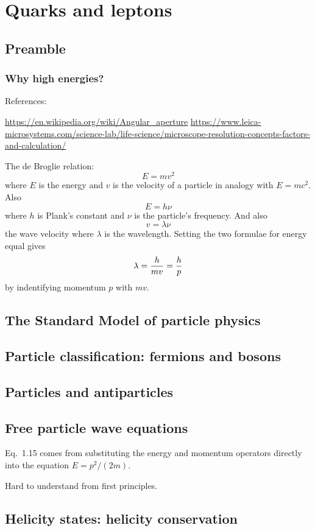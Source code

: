 \documentclass{book}
\begin{document}
\chapter{Quarks and leptons}

\section{Preamble}

\subsection{Why high energies?}

References:

\url{https://en.wikipedia.org/wiki/Angular\_aperture}
\url{https://www.leica-microsystems.com/science-lab/life-science/microscope-resolution-concepts-factors-and-calculation/}

The de Broglie relation:
$$
E = mv^2
$$
where $E$ is the energy and $v$ is the velocity of a particle in analogy with $E=mc^2$. Also
$$
E = h\nu
$$
where $h$ is Plank's constant and $\nu$ is the particle's frequency. And also
$$
v = \lambda\nu
$$
the wave velocity where $\lambda$ is the wavelength. Setting the two formulae for energy equal gives
$$
\lambda = {h \over mv} = {h \over p}
$$
by indentifying momentum $p$ with $mv$.

\section{The Standard Model of particle physics}
\section{Particle classification: fermions and bosons}
\section{Particles and antiparticles}
\section{Free particle wave equations}
Eq.\ 1.15 comes from substituting the energy and momentum operators directly into the equation $E = p^2/(2m)$.

Hard to understand from first principles.

\section{Helicity states: helicity conservation}
\end{document}
